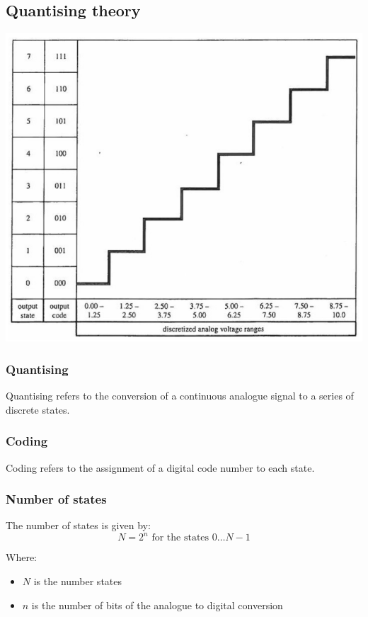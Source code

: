 \documentclass[11pt]{article}
\begin{document}
\subsection{Quantising theory}
\label{sec:orgced79ba}
\begin{center}
\includegraphics[width=.9\linewidth]{./images/quantising-theory.png}
\end{center}

\subsubsection{Quantising}
\label{sec:org882e50f}
Quantising refers to the conversion of a continuous analogue signal to a series of discrete states.

\subsubsection{Coding}
\label{sec:org3d52686}
Coding refers to the assignment of a digital code number to each state.

\subsubsection{Number of states}
\label{sec:orgf1a305c}
The number of states is given by:
\[N = 2^n \text{ for the states } 0 \ldots N - 1\]

Where:
\begin{itemize}
\item \(N\) is the number states
\item \(n\) is the number of bits of the analogue to digital conversion
\end{itemize}
\end{document}
